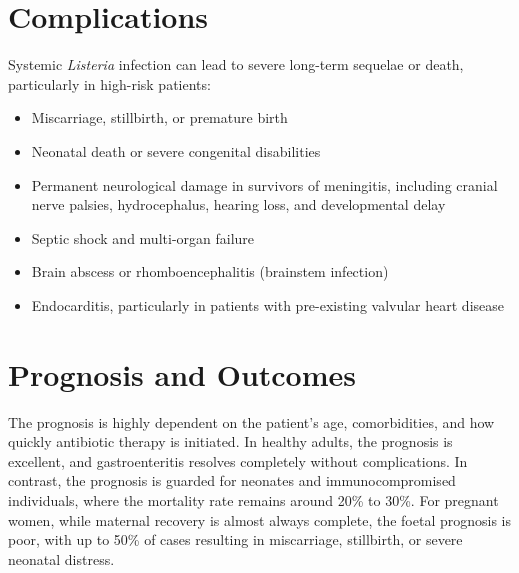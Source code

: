 \section*{Complications}
Systemic \textit{Listeria} infection can lead to severe long-term sequelae or death, particularly in high-risk patients:
\begin{itemize}
    \item Miscarriage, stillbirth, or premature birth
    \item Neonatal death or severe congenital disabilities
    \item Permanent neurological damage in survivors of meningitis, including cranial nerve palsies, hydrocephalus, hearing loss, and developmental delay
    \item Septic shock and multi-organ failure
    \item Brain abscess or rhomboencephalitis (brainstem infection)
    \item Endocarditis, particularly in patients with pre-existing valvular heart disease
\end{itemize}

\section*{Prognosis and Outcomes}
The prognosis is highly dependent on the patient's age, comorbidities, and how quickly antibiotic therapy is initiated. In healthy adults, the prognosis is excellent, and gastroenteritis resolves completely without complications. In contrast, the prognosis is guarded for neonates and immunocompromised individuals, where the mortality rate remains around 20\% to 30\%. For pregnant women, while maternal recovery is almost always complete, the foetal prognosis is poor, with up to 50\% of cases resulting in miscarriage, stillbirth, or severe neonatal distress.

